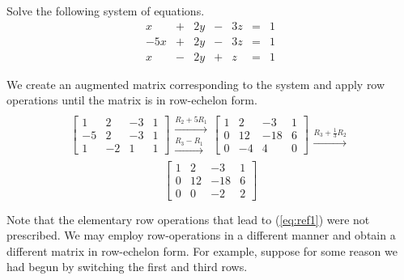 \documentclass{ximera}
\begin{document}
 
\begin{exploration}\label{init:gaussianelim1}
Solve the following system of equations.
$$\begin{array}{ccccccccc}
      x &+ &2y&-&3z&= &1 \\
     -5x& +&2y&-&3z&=&1\\
      x&- &2y&+&z&=&1
    \end{array}$$
 
We create an augmented matrix corresponding to the system and apply row operations until the matrix is in row-echelon form. 
$$\left[\begin{array}{ccc|c} 
 1&2&-3&1\\-5&2&-3&1\\1&-2&1&1
 \end{array}\right]
 \begin{array}{c}
 \\
 \xrightarrow{R_2+5R_1}\\
 \xrightarrow{R_3-R_1}\\
 \end{array}
\left[\begin{array}{ccc|c} 
 1&2&-3&1\\0&12&-18&6\\0&-4&4&0
 \end{array}\right]
 \begin{array}{c}
 \\
 \\
 \xrightarrow{R_3+\frac{1}{3}R_2}\\
 \end{array}$$
 \begin{equation}\label{eq:ref1}
 \left[\begin{array}{ccc|c} 
 1&2&-3&1\\0&12&-18&6\\0&0&-2&2
 \end{array}\right]
\end{equation}
 
Note that the elementary row operations that lead to (\ref{eq:ref1}) were not prescribed.  We may employ row-operations in a different manner and obtain a different matrix in row-echelon form.  For example, suppose for some reason we had begun by switching the first and third rows.
 

\end{exploration}
\end{document}
